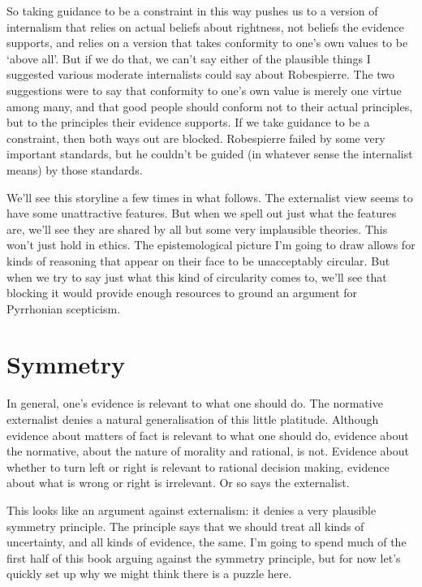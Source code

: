 \documentclass[
  10pt,
  letterpaper,
  twoside]{scrbook}
\begin{document}
So taking guidance to be a constraint in this way pushes us to a version
of internalism that relies on actual beliefs about rightness, not
beliefs the evidence supports, and relies on a version that takes
conformity to one's own values to be `above all'. But if we do that, we
can't say either of the plausible things I suggested various moderate
internalists could say about {Robespierre}. The two suggestions were to
say that conformity to one's own value is merely one virtue among many,
and that good people should conform not to their actual principles, but
to the principles their evidence supports. If we take guidance to be a
constraint, then both ways out are blocked. {Robespierre} failed by some
very important standards, but he couldn't be guided (in whatever sense
the internalist means) by those standards.

We'll see this storyline a few times in what follows. The externalist
view seems to have some unattractive features. But when we spell out
just what the features are, we'll see they are shared by all but some
very implausible theories. This won't just hold in ethics. The
epistemological picture I'm going to draw allows for kinds of reasoning
that appear on their face to be unacceptably circular. But when we try
to say just what this kind of circularity comes to, we'll see that
blocking it would provide enough resources to ground an argument for
Pyrrhonian scepticism.

\section{Symmetry}\label{symmetry}

In general, one's evidence is relevant to what one should do. The
normative externalist denies a natural generalisation of this little
platitude. Although evidence about matters of fact is relevant to what
one should do, evidence about the normative, about the nature of
morality and rational, is not. Evidence about whether to turn left or
right is relevant to rational decision making, evidence about what is
wrong or right is irrelevant. Or so says the externalist.

This looks like an argument against externalism: it denies a very
plausible symmetry principle. The principle says that we should treat
all kinds of uncertainty, and all kinds of evidence, the same. I'm going
to spend much of the first half of this book arguing against the
symmetry principle, but for now let's quickly set up why we might think
there is a puzzle here.
\end{document}
